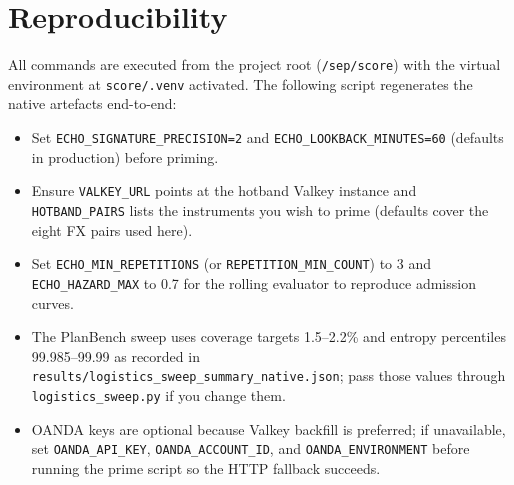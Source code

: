 \documentclass[11pt]{article}
\begin{document}
\section{Reproducibility}
All commands are executed from the project root (\texttt{/sep/score}) with the virtual environment at \texttt{score/.venv} activated.
The following script regenerates the native artefacts end-to-end:
\begin{itemize}
  \item Set \texttt{ECHO\_SIGNATURE\_PRECISION=2} and \texttt{ECHO\_LOOKBACK\_MINUTES=60} (defaults in production) before priming.
  \item Ensure \texttt{VALKEY\_URL} points at the hotband Valkey instance and \texttt{HOTBAND\_PAIRS} lists the instruments you wish to prime (defaults cover the eight FX pairs used here).
  \item Set \texttt{ECHO\_MIN\_REPETITIONS} (or \texttt{REPETITION\_MIN\_COUNT}) to 3 and \texttt{ECHO\_HAZARD\_MAX} to 0.7 for the rolling evaluator to reproduce admission curves.
  \item The PlanBench sweep uses coverage targets 1.5--2.2\% and entropy percentiles 99.985--99.99 as recorded in \texttt{results/logistics\_sweep\_summary\_native.json}; pass those values through \texttt{logistics\_sweep.py} if you change them.
  \item OANDA keys are optional because Valkey backfill is preferred; if unavailable, set \texttt{OANDA\_API\_KEY}, \texttt{OANDA\_ACCOUNT\_ID}, and \texttt{OANDA\_ENVIRONMENT} before running the prime script so the HTTP fallback succeeds.
\end{itemize}
\end{document}
